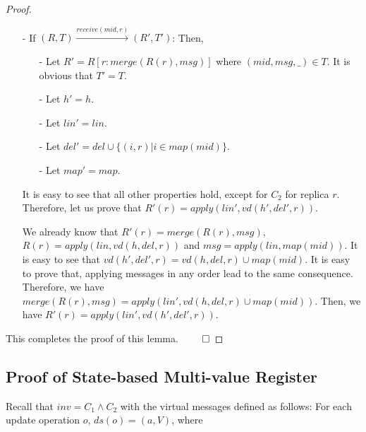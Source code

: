 {\begin {proof}
\begin{itemize}
\item[-] If $(R,T) {\xrightarrow{\mathit{receive}(\mathit{mid},r)}} (R',T')$: Then,

    \begin{itemize}
    \setlength{\itemsep}{0.5pt}
    \item[-] Let $R' = R[ r: \mathit{merge}(R(r),\mathit{msg})]$ where $(\mathit{mid},\mathit{msg},\_) \in T$. It is obvious that $T' = T$.

    \item[-] Let $h' = h$.

    \item[-] Let $\mathit{lin}' = \mathit{lin}$.

    \item[-] Let $\mathit{del}' = \mathit{del} \cup \{ (i,r) \vert i \in \mathit{map}(\mathit{mid}) \}$.

    \item[-] Let $\mathit{map}' = \mathit{map}$.
    \end{itemize}

    It is easy to see that all other properties hold, except for $C_2$ for replica $r$. Therefore, let us prove that $R'(r) = \mathit{apply}(\mathit{lin}',\mathit{vd}(h',\mathit{del}',r))$.

    We already know that $R'(r) = \mathit{merge}(R(r), \mathit{msg})$, $R(r) = \mathit{apply}(\mathit{lin},\mathit{vd}(h,\mathit{del},r))$ and $\mathit{msg} = \mathit{apply}(\mathit{lin},\mathit{map}(\mathit{mid}))$. It is easy to see that $\mathit{vd}(h',\mathit{del}',r) = \mathit{vd}(h,\mathit{del},r) \cup \mathit{map}(\mathit{mid})$. It is easy to prove that, applying messages in any order lead to the same consequence. Therefore, we have $\mathit{merge}(R(r), \mathit{msg}) = \mathit{apply}(\mathit{lin}',\mathit{vd}(h,\mathit{del},r) \cup \mathit{map}(\mathit{mid}))$. Then, we have $R'(r) = \mathit{apply}(\mathit{lin}',\mathit{vd}(h',\mathit{del}',r))$.
\end{itemize}

This completes the proof of this lemma. $\qed$
\end {proof}




\subsection{Proof of State-based Multi-value Register}
\label{subsec:appendix proof of state-based multi-value register}

Recall that $\mathit{inv} = C_1 \wedge C_2$ with the virtual messages defined as follows: For each update operation $o$, $\mathit{ds}(o) = (a,V)$, where

}
